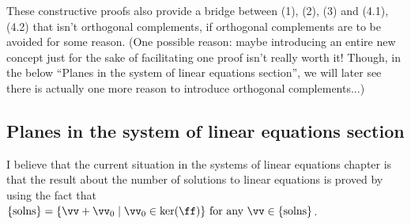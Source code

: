 \vspace{.25cm}

These constructive proofs also provide a bridge between (1), (2), (3) and (4.1), (4.2) that isn't orthogonal complements, if orthogonal complements are to be avoided for some reason. (One possible reason: maybe introducing an entire new concept just for the sake of facilitating one proof isn't really worth it! Though, in the below ``Planes in the system of linear equations section'', we will later see there is actually one more reason to introduce orthogonal complements...)

\subsection*{Planes in the system of linear equations section}

I believe that the current situation in the systems of linear equations chapter is that the result about the number of solutions to linear equations is proved by using the fact that $        \{\text{solns}\} = \{ \vv + \vv_0 \mid \vv_0 \in \ker(\ff) \} \text{ for any $\vv \in \{\text{solns}\}$}$.


